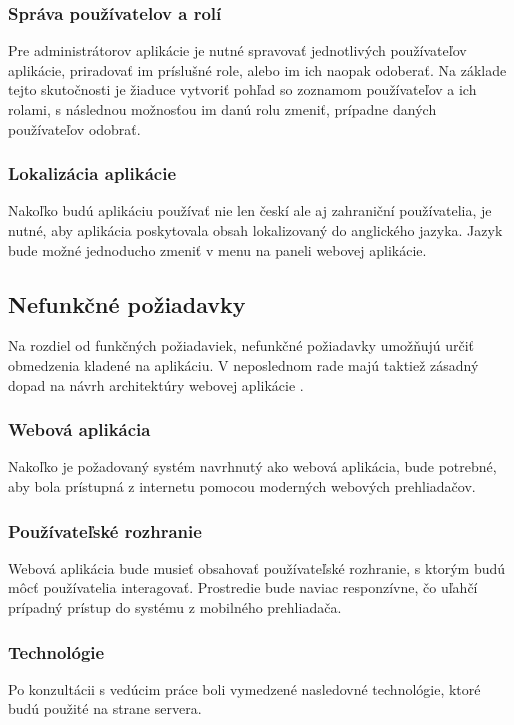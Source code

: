 \subsubsection{Správa používatelov a rolí}\label{sprava-pouzivatelov-a-roli}
Pre administrátorov aplikácie je nutné spravovať jednotlivých používateľov aplikácie, priradovať im príslušné role, alebo im ich naopak odoberať. Na základe tejto skutočnosti je žiaduce vytvoriť pohľad so zoznamom používateľov a ich rolami, s následnou možnosťou im danú rolu zmeniť, prípadne daných používateľov odobrať.

\subsubsection{Lokalizácia aplikácie}
Nakoľko budú aplikáciu používať nie len českí ale aj zahraniční používatelia, je nutné, aby aplikácia poskytovala obsah lokalizovaný do anglického jazyka. Jazyk bude možné jednoducho zmeniť v menu na paneli webovej aplikácie.

\subsection{Nefunkčné požiadavky}
Na rozdiel od funkčných požiadaviek, nefunkčné požiadavky umožňujú určiť obmedzenia kladené na aplikáciu. V neposlednom rade majú taktiež zásadný dopad na návrh architektúry webovej aplikácie \cite{funkcne-a-nefunkcne-poziadavky}.

\subsubsection{Webová aplikácia}
Nakoľko je požadovaný systém navrhnutý ako webová aplikácia, bude potrebné, aby bola prístupná z internetu pomocou moderných webových prehliadačov.

\subsubsection{Používateľské rozhranie}
Webová aplikácia bude musieť obsahovať používateľské rozhranie, s ktorým budú môcť používatelia interagovať.
Prostredie bude naviac responzívne, čo uľahčí prípadný prístup do systému z mobilného prehliadača.

\subsubsection{Technológie}
Po konzultácii s vedúcim práce boli vymedzené nasledovné technológie, ktoré budú použité na strane servera.


